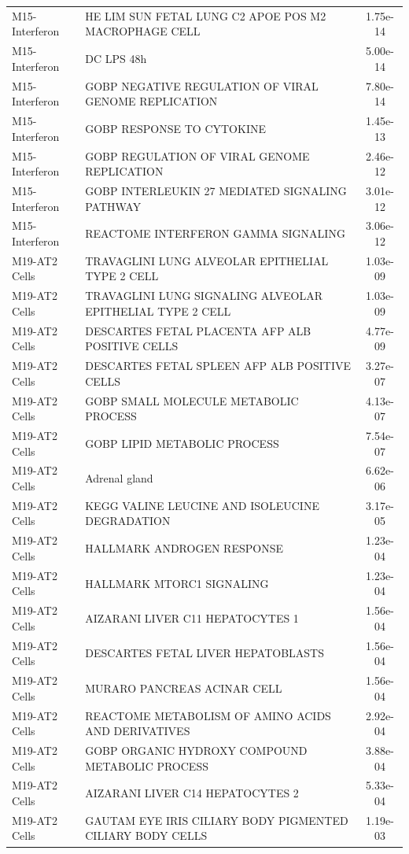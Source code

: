 \documentclass[
]{article}
\begin{document}
\begin{singlespace}
\begin{longtable}[t]{>{\raggedright\arraybackslash}p{1.4in}>{\raggedright\arraybackslash}p{4.5in}c}
M15-Interferon & HE LIM SUN FETAL LUNG C2 APOE POS M2 MACROPHAGE CELL & 1.75e-14\\
M15-Interferon & DC LPS 48h & 5.00e-14\\
\addlinespace
M15-Interferon & GOBP NEGATIVE REGULATION OF VIRAL GENOME REPLICATION & 7.80e-14\\
M15-Interferon & GOBP RESPONSE TO CYTOKINE & 1.45e-13\\
M15-Interferon & GOBP REGULATION OF VIRAL GENOME REPLICATION & 2.46e-12\\
M15-Interferon & GOBP INTERLEUKIN 27 MEDIATED SIGNALING PATHWAY & 3.01e-12\\
M15-Interferon & REACTOME INTERFERON GAMMA SIGNALING & 3.06e-12\\
\addlinespace
M19-AT2 Cells & TRAVAGLINI LUNG ALVEOLAR EPITHELIAL TYPE 2 CELL & 1.03e-09\\
M19-AT2 Cells & TRAVAGLINI LUNG SIGNALING ALVEOLAR EPITHELIAL TYPE 2 CELL & 1.03e-09\\
M19-AT2 Cells & DESCARTES FETAL PLACENTA AFP ALB POSITIVE CELLS & 4.77e-09\\
M19-AT2 Cells & DESCARTES FETAL SPLEEN AFP ALB POSITIVE CELLS & 3.27e-07\\
M19-AT2 Cells & GOBP SMALL MOLECULE METABOLIC PROCESS & 4.13e-07\\
\addlinespace
M19-AT2 Cells & GOBP LIPID METABOLIC PROCESS & 7.54e-07\\
M19-AT2 Cells & Adrenal gland & 6.62e-06\\
M19-AT2 Cells & KEGG VALINE LEUCINE AND ISOLEUCINE DEGRADATION & 3.17e-05\\
M19-AT2 Cells & HALLMARK ANDROGEN RESPONSE & 1.23e-04\\
M19-AT2 Cells & HALLMARK MTORC1 SIGNALING & 1.23e-04\\
\addlinespace
M19-AT2 Cells & AIZARANI LIVER C11 HEPATOCYTES 1 & 1.56e-04\\
M19-AT2 Cells & DESCARTES FETAL LIVER HEPATOBLASTS & 1.56e-04\\
M19-AT2 Cells & MURARO PANCREAS ACINAR CELL & 1.56e-04\\
M19-AT2 Cells & REACTOME METABOLISM OF AMINO ACIDS AND DERIVATIVES & 2.92e-04\\
M19-AT2 Cells & GOBP ORGANIC HYDROXY COMPOUND METABOLIC PROCESS & 3.88e-04\\
\addlinespace
M19-AT2 Cells & AIZARANI LIVER C14 HEPATOCYTES 2 & 5.33e-04\\
M19-AT2 Cells & GAUTAM EYE IRIS CILIARY BODY PIGMENTED CILIARY BODY CELLS & 1.19e-03\\

\end{longtable}
\end{singlespace}
\end{document}
